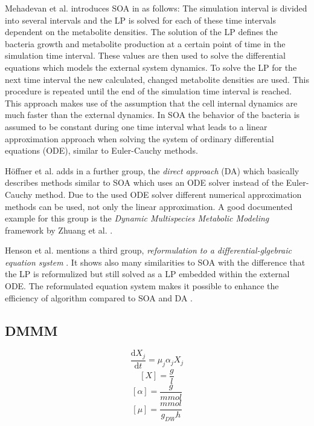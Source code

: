 \documentclass[a4paper,10pt]{article}
\begin{document}
Mehadevan et al. introduces SOA in \cite{mahadevan_dynamic_2002} as follows: The simulation interval is divided into several intervals and the LP is solved for each
of these time intervals dependent on the metabolite densities. The solution of the LP defines the bacteria growth and metabolite
production at a certain point of time in the simulation time interval. These values are then used to solve the differential equations
which models the external system dynamics. To solve the LP for the next time interval the new calculated, changed metabolite densities
are used. This procedure is repeated until the end of the simulation time interval is reached. This approach makes use of the
assumption that the cell internal dynamics are much faster than the external dynamics. In SOA the behavior of the bacteria is assumed
to be constant during one time interval what leads to a linear approximation approach when solving the system of ordinary differential
equations (ODE), similar to Euler-Cauchy methods.

Höffner et al. adds in \cite{hoffner_reliable_2013} a further group, the \textit{direct approach} (DA) which basically describes methods
similar to SOA which uses an ODE solver instead of the Euler-Cauchy method. Due to the used ODE solver different numerical approximation
methods can be used, not only the linear approximation. A good documented example for this group is the \textit{Dynamic Multispecies
Metabolic Modeling} framework by Zhuang et al. \cite{zhuang_design_2012}.

Henson et al. mentions a third group, \textit{reformulation to a differential-glgebraic equation system} \cite{henson_dynamic_2014}.
It shows also many similarities to SOA with the difference that the LP is reformulized but still solved as a LP embedded within 
the external ODE. The reformulated equation system makes it possible to enhance the efficiency of algorithm compared to SOA and DA
\cite{hoffner_reliable_2013}.

\subsection{DMMM}

\begin{equation}
 \frac{\mathrm d X_j}{\mathrm d t} = \mu_j \alpha_j X_j
\end{equation}
\begin{equation}
 \left[ X \right] = \frac{g}{l}
\end{equation}
\begin{equation}
 \left[ \alpha \right] = \frac{g}{mmol}
\end{equation}
\begin{equation}
 \left[ \mu \right] = \frac{mmol}{g_{DW} h}
\end{equation}
\end{document}
